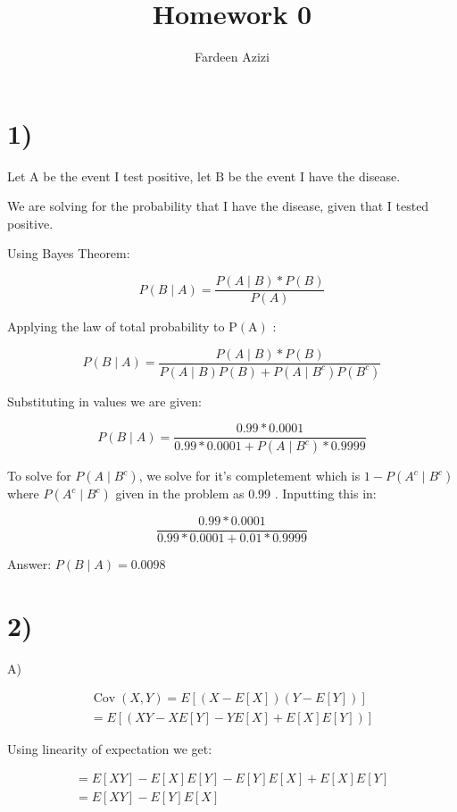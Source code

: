 \documentclass[10pt]{article}
\title{Homework 0 }
\author{Fardeen Azizi}
\begin{document}
\maketitle

\section*{1)}

Let $\mathrm{A}$ be the event I test positive, let $\mathrm{B}$ be the event I have the disease.

We are solving for the probability that I have the disease, given that I tested positive.

Using Bayes Theorem:

$$
P(B \mid A)=\frac{P(A \mid B) * P(B)}{P(A)}
$$

Applying the law of total probability to $\mathrm{P}(\mathrm{A})$ :

$$
P(B \mid A)=\frac{P(A \mid B) * P(B)}{P(A \mid B) P(B)+P\left(A \mid B^{c}\right) P\left(B^{c}\right)}
$$

Substituting in values we are given:

$$
P(B \mid A)=\frac{0.99 * 0.0001}{0.99 * 0.0001+P\left(A \mid B^{c}\right) * 0.9999}
$$

To solve for $P\left(A \mid B^{c}\right)$, we solve for it's completement which is $1-P\left(A^{c} \mid B^{c}\right)$ where $P\left(A^{c} \mid B^{c}\right)$ given in the problem as 0.99 . Inputting this in:

$$
\frac{0.99 * 0.0001}{0.99 * 0.0001+0.01 * 0.9999}
$$

\begin{tcolorbox}[colback=red!5!white,colframe=red!75!black]
  \centering Answer: $P(B \mid A)=0.0098$
\end{tcolorbox}
\newpage

\section*{2)}

A)

$$
\begin{gathered}
\operatorname{Cov}(X, Y)=E[(X-E[X])(Y-E[Y])] \\
=E[(X Y-X E[Y]-Y E[X]+E[X] E[Y])]
\end{gathered}
$$

Using linearity of expectation we get:

$$
\begin{gathered}
=E[X Y]-E[X] E[Y]-E[Y] E[X]+E[X] E[Y] \\
=E[X Y]-E[Y] E[X]
\end{gathered}
$$
\end{document}
